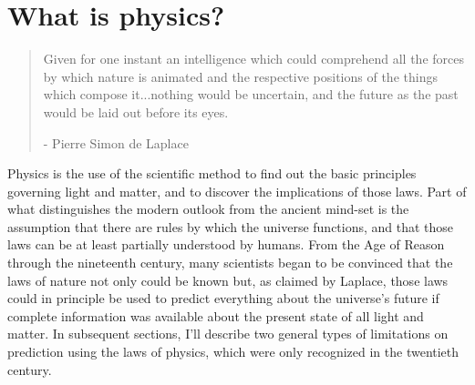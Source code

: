

\section{What is physics?}


\begin{quotation}
Given for one instant an intelligence which could comprehend
all the forces by which nature is animated and the
respective positions of the things which compose it...nothing
would be uncertain, and the future as the past would be laid
out before its eyes. 
\begin{flushright} - Pierre Simon de Laplace
\end{flushright}
\label{laplace-quote}
\end{quotation}


Physics is the use of the scientific method
to find out the basic principles governing light and matter,
and to discover the implications of those laws. Part of what
distinguishes the modern outlook from the ancient mind-set
is the assumption that there are rules by which the universe
functions, and that those laws can be at least partially
understood by humans. From the Age of Reason through the
nineteenth century, many scientists began to be convinced
that the laws of nature not only could be known but, as
claimed by Laplace, those laws could in principle be used to
predict everything about the universe's future if complete
information was available about the present state of all
light and matter. In subsequent sections, I'll describe two
general types of limitations on prediction using the laws of
physics, which were only recognized in the twentieth century.

